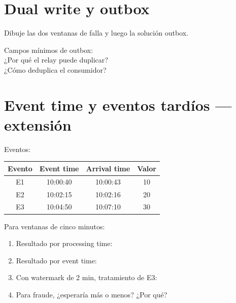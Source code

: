 \documentclass[variant=guia,cover=institutional,mode=print]{ua-engineering-v6-article}
\begin{document}
\newpage
\section{Dual write y outbox}
Dibuje las dos ventanas de falla y luego la solución outbox.

\begin{center}
\end{center}

Campos mínimos de outbox: \hrulefill\\[0.5cm]
¿Por qué el relay puede duplicar? \hrulefill\\[0.5cm]
¿Cómo deduplica el consumidor? \hrulefill

\newpage
\section{Event time y eventos tardíos --- extensión}
Eventos:
\begin{center}
\begin{tabular}{cccc}
\toprule
Evento & Event time & Arrival time & Valor \\
\midrule
E1 & 10:00:40 & 10:00:43 & 10 \\
E2 & 10:02:15 & 10:02:16 & 20 \\
E3 & 10:04:50 & 10:07:10 & 30 \\
\bottomrule
\end{tabular}
\end{center}

Para ventanas de cinco minutos:
\begin{enumerate}
\item Resultado por processing time: \hrulefill
\item Resultado por event time: \hrulefill
\item Con watermark de 2 min, tratamiento de E3: \hrulefill
\item Para fraude, ¿esperaría más o menos? ¿Por qué? \vspace{1cm}
\end{enumerate}
\end{document}
